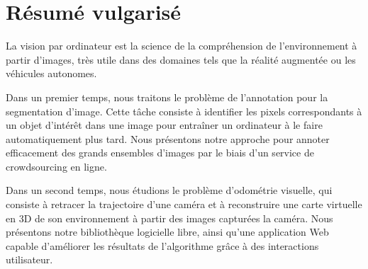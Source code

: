 \section*{Résumé vulgarisé}%
\label{sec:resume-vulgarise}

La vision par ordinateur est la science de la compréhension de l'environnement à partir d'images,
très utile dans des domaines tels que la réalité augmentée ou les véhicules autonomes.

Dans un premier temps, nous traitons le problème de l'annotation pour la segmentation d'image.
Cette tâche consiste à identifier les pixels correspondants
à un objet d'intérêt dans une image pour entraîner un ordinateur à
le faire automatiquement plus tard.
Nous présentons notre approche pour annoter efficacement des grands ensembles d'images
par le biais d'un service de crowdsourcing en ligne.

Dans un second temps, nous étudions le problème d'odométrie visuelle,
qui consiste à retracer la trajectoire d'une caméra et à reconstruire
une carte virtuelle en 3D de son environnement à partir des images capturées la caméra.
Nous présentons notre bibliothèque logicielle libre, ainsi qu'une application Web capable
d'améliorer les résultats de l'algorithme grâce à des interactions utilisateur.
